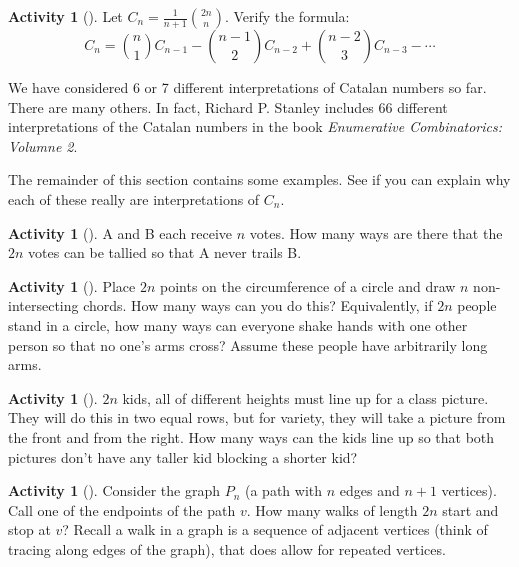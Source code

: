 \documentclass[10pt,]{book}
\theoremstyle{plain}
\theoremstyle{definition}
\theoremstyle{definition}
\theoremstyle{definition}
\newtheorem{activity}[project]{Activity}
\numberwithin{equation}{chapter}
\begin{document}
\begin{activity}[]\label{activity-181}
\hypertarget{p-1051}{}%
Let \(C_{n} = \frac{1}{n + 1}\binom{2n}{n}\). Verify the formula:%
\begin{equation*}
C_{n} = \binom{n}{1} C_{n - 1} - \binom{n - 1}{2} C_{n - 2} + \binom{n - 2}{3} C_{n - 3} - \cdots
\end{equation*}
%
\end{activity}
\hypertarget{p-1052}{}%
We have considered 6 or 7 different interpretations of Catalan numbers so far.  There are many others.  In fact, Richard P. Stanley includes 66 different interpretations of the Catalan numbers in the book \emph{Enumerative Combinatorics: Volumne 2}.%
\par
\hypertarget{p-1053}{}%
The remainder of this section contains some examples.  See if you can explain why each of these really are interpretations of \(C_n\).%
\begin{activity}[]\label{activity-182}
\hypertarget{p-1054}{}%
A and B each receive \(n\) votes. How many ways are there that the \(2n\) votes can be tallied so that A never trails B.%
\end{activity}
\begin{activity}[]\label{activity-183}
\hypertarget{p-1055}{}%
Place \(2n\) points on the circumference of a circle and draw \(n\)  non-intersecting chords.  How many ways can you do this?  Equivalently, if \(2n\) people stand in a circle, how many ways can everyone shake hands with one other person so that no one's arms cross?  Assume these people have arbitrarily long arms.%
\end{activity}
\begin{activity}[]\label{activity-184}
\hypertarget{p-1056}{}%
\(2n\) kids, all of different heights must line up for a class picture.  They will do this in two equal rows, but for variety, they will take a picture from the front and from the right.  How many ways can the kids line up so that both pictures don't have any taller kid blocking a shorter kid?%
\end{activity}
\begin{activity}[]\label{activity-185}
\hypertarget{p-1057}{}%
Consider the graph \(P_n\) (a path with \(n\) edges and \(n+1\) vertices).  Call one of the endpoints of the path \(v\).  How many walks of length \(2n\) start and stop at \(v\)?  Recall a walk in a graph is a sequence of adjacent vertices (think of tracing along edges of the graph), that does allow for repeated vertices.%
\end{activity}
\end{document}
